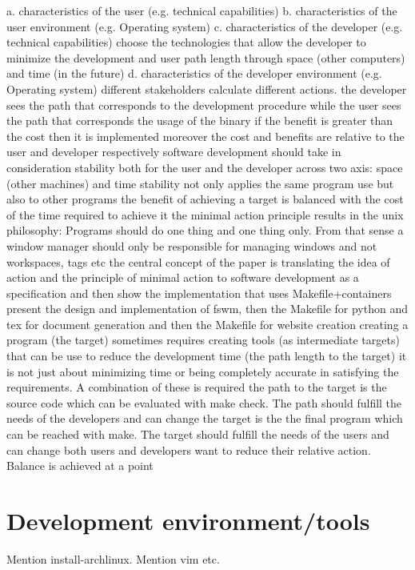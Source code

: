 \documentclass[journal]{IEEEtran}
\begin{document}
a. characteristics of the user (e.g. technical capabilities)
b. characteristics of the user environment (e.g. Operating system)
c. characteristics of the developer (e.g. technical capabilities)
choose the technologies that allow the developer to minimize the development and user path length through space (other computers) and time (in the future)
d. characteristics of the developer environment (e.g. Operating system)
different stakeholders calculate different actions. the developer sees the path that corresponds to the development procedure while the user sees the path that corresponds the usage of the binary
if the benefit is greater than the cost then it is implemented
moreover the cost and benefits are relative to the user and developer respectively
software development should take in consideration stability both for the user and the developer across two axis: space (other machines) and time
stability not only applies the same program use but also to other programs
the benefit of achieving a target is balanced with the cost of the time required to achieve it
the minimal action principle results in the unix philosophy: Programs should do one thing and one thing only. From that sense a window manager should only be responsible for managing windows and not workspaces, tags etc
the central concept of the paper is translating the idea of action and the principle of minimal action to software development as a specification and then show the implementation that uses Makefile+containers
present the design and implementation of fswm, then the Makefile for python and tex for document generation and then the Makefile for website creation
creating a program (the target) sometimes requires creating tools (as intermediate targets) that can be use to reduce the development time (the path length to the target)
it is not just about minimizing time or being completely accurate in satisfying the requirements. A combination of these is required
the path to the target is the source code which can be evaluated with make check. The path should fulfill the needs of the developers and can change
the target is the the final program which can be reached with make. The target should fulfill the needs of the users and can change
both users and developers want to reduce their relative action. Balance is achieved at a point

\section{Development environment/tools}
Mention install-archlinux.
Mention vim etc.
\end{document}
